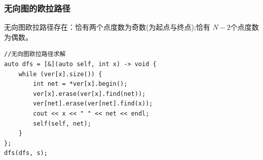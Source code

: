 \subsubsection{无向图的欧拉路径}
无向图欧拉路径存在：恰有两个点度数为奇数(为起点与终点);恰有 $N - 2$个点度数为偶数。
\begin{lstlisting}[caption={}]
//无向图欧拉路径求解
auto dfs = [&](auto self, int x) -> void {
    while (ver[x].size()) {
        int net = *ver[x].begin();
        ver[x].erase(ver[x].find(net));
        ver[net].erase(ver[net].find(x));
        cout << x << " " << net << endl;
        self(self, net);
    }
};
dfs(dfs, s);
\end{lstlisting}
